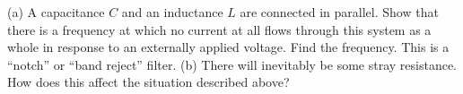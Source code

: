 (a) A capacitance $C$ and an inductance $L$ are connected in parallel. Show that
there is a frequency at which no current at all flows through this system as a whole in response to an
externally applied voltage. Find the frequency. This is a ``notch'' or ``band reject'' filter.\answercheck\hwendpart
(b) There will inevitably be some stray resistance. How does this affect the situation described above?

